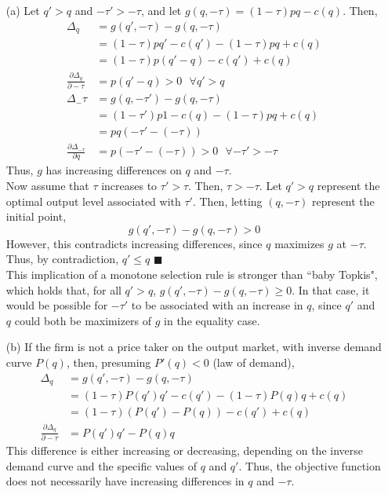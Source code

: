 \documentclass{article}
\begin{document}
\begin{itemize}
	\item[(a)] Let $q'>q$ and $-\tau'>-\tau$, and let $g(q,-\tau)=(1-\tau)pq-c(q)$. Then, 
			\begin{align*}
				\Delta_q									&= g(q',-\tau)-g(q,-\tau) 				\\
															&= (1-\tau)pq'-c(q')-(1-\tau)pq+c(q)	\\
															&= (1-\tau)p(q'-q)-c(q')+c(q)			\\
				\frac{\partial\Delta_q}{\partial-\tau}		&= p(q'-q) >0\text{ }\forall q'>q		\\
				\Delta_-\tau								&= g(q,-\tau')-g(q,-\tau) 				\\
															&= (1-\tau')p1-c(q)-(1-\tau)pq+c(q)		\\
															&= 	pq(-\tau'-(-\tau))					\\
				\frac{\partial\Delta_{-\tau}}{\partial q}	&= 	p(-\tau'-(-\tau)) >0\text{ }\forall -\tau'>-\tau					
			\end{align*}
			Thus, $g$ has increasing differences on $q$ and $-\tau$.
			\smallskip \\
			Now assume that $\tau$ increases to $\tau'>\tau$. Then, $\tau>-\tau$. Let $q'>q$ represent the optimal output level associated with $\tau'$. Then, letting $(q,-\tau)$ represent the initial point,
			\[
				g(q',-\tau)-g(q,-\tau) > 0
			\]
			However, this contradicts increasing differences, since $q$ maximizes $g$ at $-\tau$. Thus, by contradiction, $q'\leq q$ $\blacksquare$
			\medskip \\
			This implication of a monotone selection rule is stronger than ``baby Topkis", which holds that, for all $q'>q$, $g(q',-\tau)-g(q,-\tau) \geq 0$. In that case, it would be possible for $-\tau'$ to be associated with an increase in $q$, since $q'$ and $q$ could both be maximizers of $g$ in the equality case.
		
	\item[(b)] If the firm is not a price taker on the output market, with inverse demand curve $P(q)$, then, presuming $P'(q)<0$ (law of demand),
		\begin{align*}
				\Delta_q								&= g(q',-\tau)-g(q,-\tau) 					\\
														&= (1-\tau)P(q')q'-c(q')-(1-\tau)P(q)q+c(q)	\\
														&= (1-\tau)(P(q')-P(q))-c(q')+c(q)			\\
				\frac{\partial\Delta_q}{\partial-\tau}	&= P(q')q'-P(q)q
		\end{align*}
		This difference is either increasing or decreasing, depending on the inverse demand curve and the specific values of $q$ and $q'$. Thus, the objective function does not necessarily have increasing differences in $q$ and $-\tau$.
		

\end{itemize}
\end{document}

